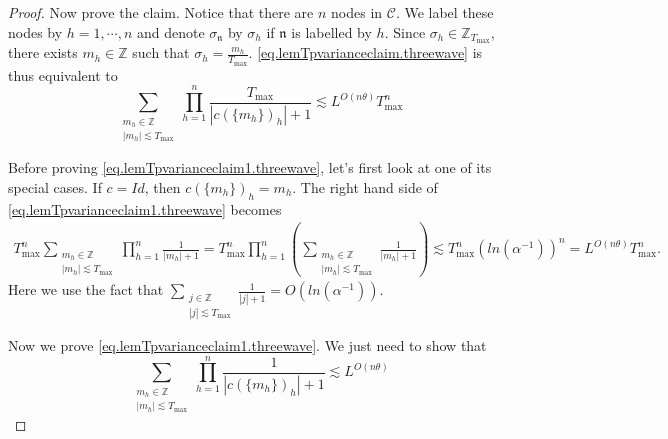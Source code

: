 \begin{proof}
Now prove the claim. Notice that there are $n$ nodes in $\mathcal{C}$. We label these nodes by $h=1,\cdots,n$ and denote $\sigma_{\mathfrak{n}}$ by $\sigma_{h}$ if $\mathfrak{n}$ is labelled by $h$. Since $\sigma_{h}\in \mathbb{Z}_{T_{\text{max}}}$, there exists $m_{h}\in \mathbb{Z}$ such that $\sigma_{h}=\frac{m_{h}}{T_{\text{max}}}$. \eqref{eq.lemTpvarianceclaim.threewave} is thus equivalent to 
\begin{equation}\label{eq.lemTpvarianceclaim1.threewave}
    \sum_{\substack{m_{h}\in \mathbb{Z}\\ |m_{h}|\lesssim  T_{\text{max}}}} \prod_{h=1}^{n}\frac{T_{\text{max}}}{|c(\{m_{h}\})_{h}|+1}\lesssim L^{O(n\theta)}T^{n}_{\text{max}}
\end{equation}

Before proving \eqref{eq.lemTpvarianceclaim1.threewave}, let's first look at one of its special cases. If $c=Id$, then $c(\{m_{h}\})_{h}=m_h$. The right hand side of \eqref{eq.lemTpvarianceclaim1.threewave} becomes
\begin{equation}
\begin{split}
    T^{n}_{\text{max}}\sum_{\substack{m_{h}\in \mathbb{Z}\\ |m_{h}|\lesssim  T_{\text{max}}}} \prod_{h=1}^{n}\frac{1}{|m_{h}|+1} = T^{n}_{\text{max}}\prod_{h=1}^{n}\left(\sum_{\substack{m_{h}\in \mathbb{Z}\\ |m_{h}|\lesssim  T_{\text{max}}}} \frac{1}{|m_{h}|+1}\right)
    \lesssim T^{n}_{\text{max}} (ln(\alpha^{-1}))^{n}= L^{O(n\theta)}T^{n}_{\text{max}}.
\end{split}
\end{equation}
Here we use the fact that $\sum_{\substack{j\in \mathbb{Z}\\ |j|\lesssim  T_{\text{max}}}} \frac{1}{|j|+1}=O(ln(\alpha^{-1}))$.

Now we prove \eqref{eq.lemTpvarianceclaim1.threewave}. We just need to show that 
\begin{equation}\label{eq.lemTpvarianceEulerMac.threewave}
    \sum_{\substack{m_{h}\in \mathbb{Z}\\ |m_{h}|\lesssim  T_{\text{max}}}} \prod_{h=1}^{n}\frac{1}{|c(\{m_{h}\})_{h}|+1}\lesssim L^{O(n\theta)}
\end{equation}


\end{proof}
